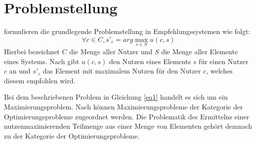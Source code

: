 \section{Problemstellung}
\label{ch:empfehlungssysteme:problemstellung}
\textcite[S. 735]{adomavicius:inproceedings} formulieren die grundlegende Problemstellung in Empfehlungssystemen wie folgt:
\begin{equation}\label{eq1}
    \forall c \in C, s'_c = arg\max_{s \in S} u(c,s)
\end{equation}
Hierbei bezeichnet $C$ die Menge aller Nutzer und $S$ die Menge aller Elemente eines Systems.
Nach \textcite[S. 735]{adomavicius:inproceedings} gibt $u(c,s)$ den Nutzen eines Elements $s$ für einen Nutzer $c$ an und $s'_c$ das Element mit maximalem Nutzen für den Nutzer $c$, welches diesem empfohlen wird.

Bei dem beschriebenen Problem in Gleichung \ref{eq1} handelt es sich um ein Maximierungsproblem.
Nach \textcite[S. 1]{book:kallrath} können Maximierungsprobleme der Kategorie der Optimierungsprobleme zugeordnet werden.
Die Problematik des Ermittelns einer nutzenmaximierenden Teilmenge aus einer Menge von Elementen gehört demnach zu der Kategorie der Optimierungsprobleme.

